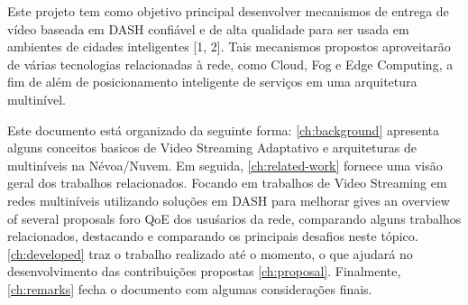 


 
Este projeto tem como objetivo principal desenvolver mecanismos de entrega de vídeo baseada em DASH confiável e de alta qualidade para ser usada em ambientes de cidades inteligentes [1, 2]. Tais mecanismos propostos aproveitarão de várias tecnologias relacionadas à rede, como Cloud, Fog e Edge Computing, a fim de além de posicionamento inteligente de serviços em uma arquitetura multinível. %

Este documento está organizado da seguinte forma: \autoref{ch:background} apresenta
alguns conceitos basicos de Video Streaming Adaptativo e arquiteturas de multiníveis na Névoa/Nuvem. Em seguida, \autoref{ch:related-work} fornece uma visão geral dos trabalhos relacionados. Focando em trabalhos de Video Streaming em redes multiníveis utilizando soluções em DASH para melhorar gives an overview of several proposals foro QoE dos usuśarios da rede, comparando alguns trabalhos relacionados, destacando e comparando os principais desafios neste tópico. \autoref{ch:developed} traz o trabalho realizado até o momento, o que ajudará no desenvolvimento das contribuições propostas \autoref{ch:proposal}. Finalmente, \autoref{ch:remarks} fecha o documento com algumas considerações finais.
 
